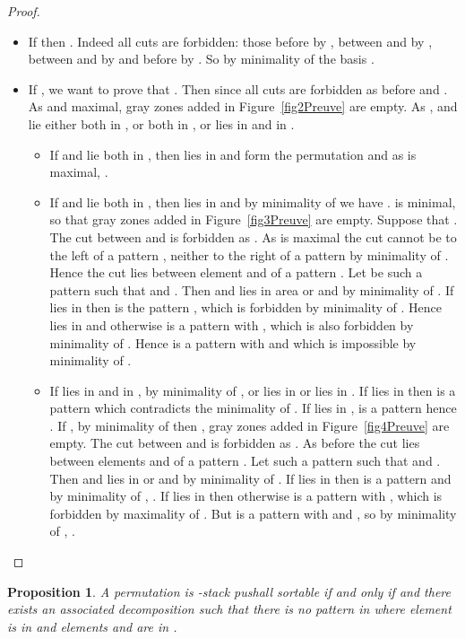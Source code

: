 \documentclass[11pt]{article}
\newtheorem{prop}[thm]{Proposition}
\newcommand{\pushall}{-stack pushall sortable\xspace}
\begin{document}
\begin{proof}
\begin{itemize}
\begin{itemize}
\item If  then . 
Indeed all cuts are forbidden: 
those before  by , between  and  by , between  and  by  and before  by . 
So by minimality of the basis .
\item If , we want to prove that . 
Then  since all cuts are forbidden as before and .
As  and  maximal, gray zones added in Figure~\ref{fig2Preuve} are empty. 
As ,  and  lie either both in , or both in , or  lies in  and  in .
\begin{itemize}
\item If  and  lie both in , then  lies in  and  form the permutation  and as  is maximal, .
\item If  and  lie both in , then  lies in  and by minimality of  we have . 
 is minimal, so that gray zones added in Figure~\ref{fig3Preuve} are empty. 
Suppose that . 
The cut between  and  is forbidden as . 
As  is maximal the cut cannot be to the left of a pattern , neither to the right of a pattern  by minimality of . 
Hence the cut lies between element  and  of a pattern . 
Let  be such a pattern  such that  and . 
Then  and  lies in area  or  and  by minimality of . 
If  lies in  then  is the pattern , which is forbidden by minimality of . 
Hence  lies in  and  otherwise  is a pattern  with , which is also forbidden by minimality of . 
Hence  is a pattern  with  and  which is impossible by minimality of .
\item If  lies in  and  in , by minimality of ,  or  lies in  or  lies in . 
If  lies in  then  is a pattern  which contradicts the minimality of . 
If  lies in ,  is a pattern  hence . 
If , by minimality of  then , gray zones added in Figure~\ref{fig4Preuve} are empty. 
The cut between  and  is forbidden as . 
As before the cut lies between elements  and  of a pattern . 
Let  such a pattern  such that  and . 
Then  and  lies in  or  and  by minimality of . 
If  lies in  then  is a pattern  and by minimality of , . 
If  lies in  then  otherwise  is a pattern  with , which is forbidden by maximality of . 
But  is a pattern  with  and , so by minimality of , .
\end{itemize}
\end{itemize}
\end{itemize}

\end{proof}


\begin{prop}
\label{prop:+[x,1]pt}
A permutation  is \pushall if and only if  and there exists an associated decomposition  such that there is no pattern  in  where element  is in  and elements  and  are in .
\end{prop}
\end{document}

